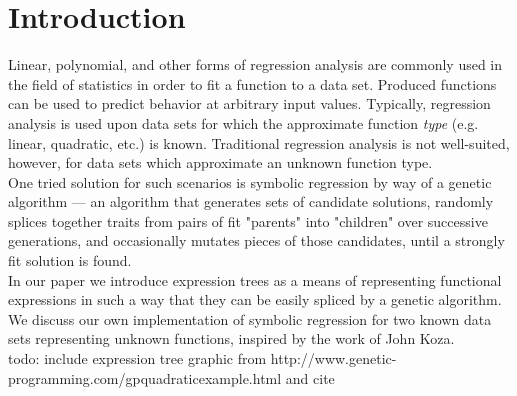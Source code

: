 
\section{Introduction}
\label{sec:intro}

Linear, polynomial, and other forms of regression analysis are commonly
used in the field of statistics in order to fit a function to a data set. Produced
functions can be used to predict behavior at arbitrary input values. Typically,
regression analysis is used upon data sets for which the approximate
function \textit{type} (e.g. linear, quadratic, etc.) is known. Traditional
regression analysis is not well-suited, however, for data sets which
approximate an unknown function type. \\

One tried solution for such scenarios is symbolic regression by way of
a genetic algorithm --- an algorithm that generates sets of candidate
solutions, randomly splices together traits from pairs of fit "parents"
into "children" over successive generations, and occasionally mutates
pieces of those candidates, until a strongly fit solution is found. \\

In our paper we introduce expression trees as a means of representing
functional expressions in such a way that they can be easily spliced by
a genetic algorithm. We discuss our own implementation of symbolic
regression for two known data sets representing unknown functions,
inspired by the work of John Koza. \cite{examplerun} \\

todo: include expression tree graphic from http://www.genetic-programming.com/gpquadraticexample.html and cite

